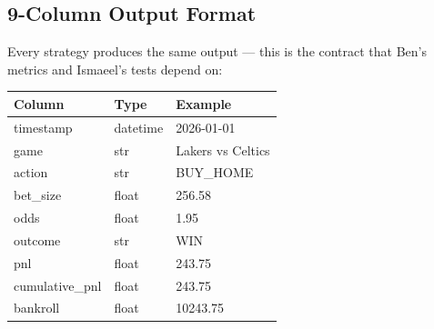 \documentclass[11pt,a4paper]{article}
\begin{document}
\begin{center}
\end{center}

\subsection{9-Column Output Format}

Every strategy produces the same output --- this is the contract that Ben's metrics and Ismaeel's tests depend on:

\begin{table}[h]
\centering
\begin{tabular}{@{}llp{6cm}@{}}
\toprule
\textbf{Column} & \textbf{Type} & \textbf{Example} \\
\midrule
timestamp & datetime & 2026-01-01 \\
game & str & Lakers vs Celtics \\
action & str & BUY\_HOME \\
bet\_size & float & 256.58 \\
odds & float & 1.95 \\
outcome & str & WIN \\
pnl & float & 243.75 \\
cumulative\_pnl & float & 243.75 \\
bankroll & float & 10243.75 \\
\bottomrule
\end{tabular}
\end{table}

\end{document}
